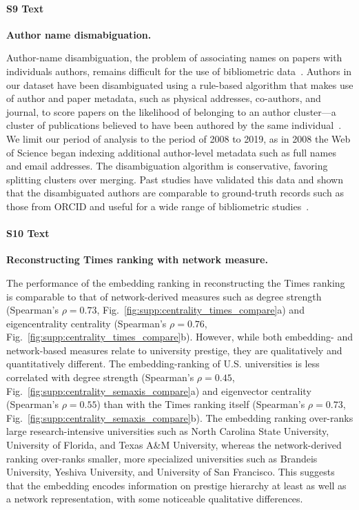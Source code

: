 \documentclass[12pt]{article} %
\begin{document}
%
\paragraph*{S9 Text}
\label{si:text:disambiguation}
{\bf Author name dismabiguation.}

Author-name disambiguation, the problem of associating names on papers with individuals authors, remains difficult for the use of bibliometric data~\autocite{dangelo2020disambiguation}.
Authors in our dataset have been disambiguated using a rule-based algorithm that makes use of author and paper metadata, such as physical addresses, co-authors, and journal, to score papers on the likelihood of belonging to an author cluster---a cluster of publications believed to have been authored by the same individual~\autocite{caron2014disambiguation}.
We limit our period of analysis to the period of 2008 to 2019, as in 2008 the Web of Science began indexing additional author-level metadata such as full names and email addresses.
The disambiguation algorithm is conservative, favoring splitting clusters over merging.
Past studies have validated this data and shown that the disambiguated authors are comparable to ground-truth records such as those from ORCID and useful for a wide range of bibliometric studies~\autocite{sugimoto2017mostimpact, robinson2019mobility, chinchilla2018global, chinchilla2018travelban}.



%
\paragraph*{S10 Text}
\label{si:text:network_ranking}
{\bf Reconstructing Times ranking with network measure.}

The performance of the embedding ranking in reconstructing the Times ranking is comparable to that of network-derived measures such as degree strength (Spearman's $\rho = 0.73$, Fig.~\ref{fig:supp:centrality_times_compare}a) and eigencentrality centrality (Spearman's $\rho = 0.76$, Fig.~\ref{fig:supp:centrality_times_compare}b).
However, while both embedding- and network-based measures relate to university prestige, they are qualitatively and quantitatively different.
The embedding-ranking of U.S. universities is less correlated with degree strength (Spearman's $\rho = 0.45$, Fig.~\ref{fig:supp:centrality_semaxis_compare}a) and eigenvector  centrality (Spearman's $\rho = 0.55$) than with the Times ranking itself (Spearman's $\rho = 0.73$, Fig.~\ref{fig:supp:centrality_semaxis_compare}b). 
The embedding ranking over-ranks large research-intensive universities such as North Carolina State University, University of Florida, and Texas A\&M University, whereas the network-derived ranking over-ranks smaller, more specialized universities such as Brandeis University, Yeshiva University, and University of San Francisco. 
This suggests that the embedding encodes information on prestige hierarchy at least as well as a network representation, with some noticeable qualitative differences.
\end{document}
